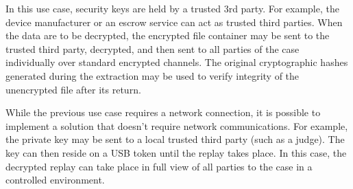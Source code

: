 In this use case, security keys are held by a trusted 3rd party. For example, the device manufacturer or an escrow service can act as
trusted third parties. When the data are to be decrypted, the encrypted file container may be sent to the trusted third party, decrypted,
and then sent to all parties of the case individually over standard encrypted channels. The original cryptographic hashes generated
during the extraction may be used to verify integrity of the unencrypted file after its return.


While the previous use case requires a network connection, it is possible to implement a solution that doesn't require network communications.
For example, the private key may be sent to a local trusted third party (such as a judge). The key can then reside on a USB token until the
replay takes place. In this case, the decrypted replay can take place in full view of all parties to the case in a controlled environment.

